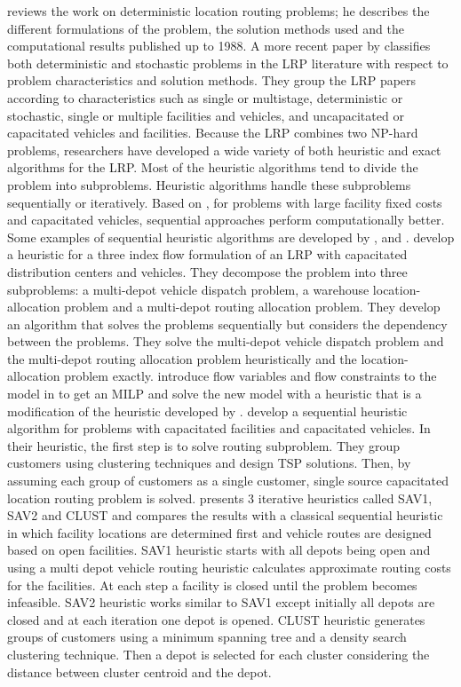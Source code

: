 \citet{Laporte} reviews the work on deterministic location routing problems; 
he describes the different formulations of the problem, the solution methods 
used and the computational results published up to 1988. A more recent paper 
by \citet{Min} classifies both deterministic and stochastic problems in the LRP 
literature with respect to problem characteristics and solution methods. They 
group the LRP papers according to characteristics such as single or multistage, 
deterministic or stochastic, single or multiple facilities and vehicles, and  
uncapacitated or capacitated vehicles and facilities. Because the LRP combines two NP-hard
problems, researchers have developed a wide variety of both heuristic and exact algorithms for 
the LRP. Most of the heuristic algorithms tend to divide the problem into subproblems. 
Heuristic algorithms handle these subproblems sequentially or iteratively. Based on \citet{Min2}, 
for problems with large facility fixed costs and capacitated vehicles, sequential approaches perform 
computationally better. Some examples of sequential heuristic algorithms are 
developed by \citet{Perl}, \citet{Hansen} and \citet{Barreto07}.
\citet{Perl} develop a heuristic for a three index flow formulation of an LRP 
with capacitated distribution centers and 
vehicles. They decompose the problem into three subproblems: a multi-depot vehicle 
dispatch problem, a warehouse location-allocation problem and a multi-depot routing 
allocation problem. They develop an algorithm 
that solves the problems sequentially but considers the dependency between the problems.  
They solve the  multi-depot vehicle dispatch problem and the multi-depot routing 
allocation problem heuristically and the location-allocation problem exactly. 
\citet{Hansen} introduce flow variables and flow constraints to the model in 
\citet{Perl} to get an MILP and solve the new model with a heuristic that is a 
modification of the heuristic developed by \citet{Perl}. \citet{Barreto07} develop 
a sequential heuristic algorithm for problems with capacitated facilities and
capacitated vehicles. In their heuristic, the first step is to solve routing 
subproblem. They group customers using clustering techniques and design TSP solutions. 
Then, by assuming each group of customers as a single customer, single source 
capacitated location routing problem is solved. \citet{Srivastava} presents 3 iterative 
heuristics called SAV1, SAV2 and CLUST and compares the results with a classical 
sequential heuristic in which facility locations are determined first and 
vehicle routes are designed based on open facilities. SAV1 heuristic starts with all 
depots being open and using a multi depot vehicle routing heuristic calculates 
approximate routing costs for the facilities. At each step a facility is closed 
until the problem becomes infeasible. SAV2 heuristic works similar to SAV1 except 
initially all depots are closed and at each iteration one depot is opened. CLUST
heuristic generates groups of customers using a minimum spanning tree and a density search 
clustering technique. Then a depot is selected for each cluster considering the 
distance between cluster centroid and the depot.

